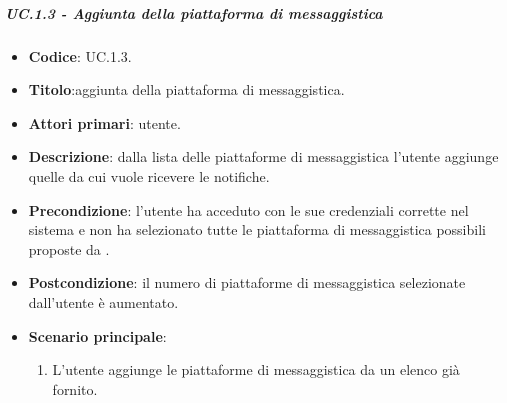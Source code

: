 	\subparagraph{UC\theuccount.1.3 - Aggiunta della piattaforma di messaggistica}
	\begin{itemize}
		\item \textbf{Codice}: UC\theuccount.1.3.
		\item \textbf{Titolo}:aggiunta della piattaforma di messaggistica.
		\item \textbf{Attori primari}: utente.
		\item \textbf{Descrizione}: dalla lista delle piattaforme di messaggistica l'utente aggiunge quelle da cui vuole ricevere le notifiche.
		\item \textbf{Precondizione}: l'utente ha acceduto con le sue credenziali corrette nel sistema e non ha selezionato tutte le piattaforma di messaggistica possibili proposte da \progetto.
		\item \textbf{Postcondizione}: il numero di piattaforme di messaggistica selezionate dall'utente è aumentato.
		\item \textbf{Scenario principale}:
		\begin{enumerate}
			\item L'utente aggiunge le piattaforme di messaggistica da un elenco già fornito.
		\end{enumerate} 
	\end{itemize}
			



